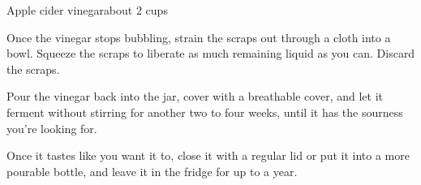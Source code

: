 \documentclass{article}
\begin{document}
\begin{recipe}{Apple cider vinegar}{about 2 cups}
    \begin{step}
      \begin{ingrs}
      \end{ingrs}
      \begin{stepdesc}
        Once the vinegar stops bubbling, strain the scraps out through a cloth into a bowl. Squeeze the scraps to liberate as much remaining liquid as you can. Discard the scraps.
      \end{stepdesc}
    \end{step}
    \begin{step}
      \begin{ingrs}
      \end{ingrs}
      \begin{stepdesc}
        Pour the vinegar back into the jar, cover with a breathable cover, and let it ferment without stirring for another two to four weeks, until it has the sourness you're looking for.
      \end{stepdesc}
    \end{step}
    \begin{step}
      \begin{ingrs}
      \end{ingrs}
      \begin{stepdesc}
        Once it tastes like you want it to, close it with a regular lid or put it into a more pourable bottle, and leave it in the fridge for up to a year.
      \end{stepdesc}
    \end{step}
  \end{recipe}
\end{document}
